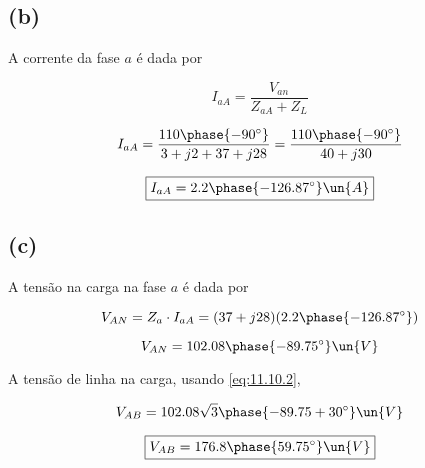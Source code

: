 \subsection*{(b)}

A corrente da fase $a$ é dada por   

\[ I_{aA} = \frac{V_{an}}{Z_{aA} + Z_L} \]

\[ I_{aA} = \frac{110\phase{-90^{\circ}}}{3 +j2 + 37 + j28} = \frac{110\phase{-90^{\circ}}}{40 + j30}  \]

\[ \boxed{I_{aA} = 2.2\phase{-126.87^{\circ}} \un{A}} \]

\subsection*{(c)}

A tensão na carga na fase $a$ é dada por   

\[ V_{AN} = Z_a \cdot I_{aA} = (37 + j28)(2.2\phase{-126.87^{\circ}}) \]

\[ V_{AN} = 102.08\phase{-89.75^{\circ}} \un{V}\]

A tensão de linha na carga, usando \eqref{eq:11.10.2},

\[ V_{AB} = 102.08\sqrt{3}\phase{-89.75 + 30^{\circ}} \un{V}\]

\[ \boxed{V_{AB} = 176.8\phase{59.75^{\circ}} \un{V}} \]



